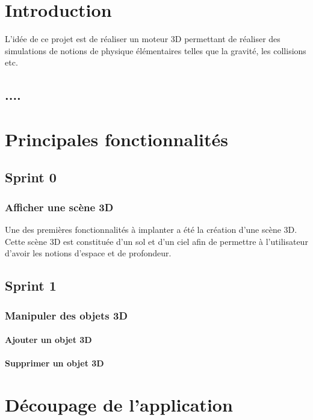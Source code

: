 \documentclass[11pt]{report}
\begin{document}


\tableofcontents


\chapter{Introduction}

L'idée de ce projet est de réaliser un moteur 3D permettant de réaliser des simulations de notions de 
physique élémentaires telles que la gravité, les collisions etc.

\section{....}





\chapter{Principales fonctionnalités}

\section{Sprint 0}

\subsection{Afficher une scène 3D}
Une des premières fonctionnalités à implanter a été la création d'une scène 3D. 
Cette scène 3D est constituée d'un sol et d'un ciel afin de permettre à l'utilisateur d'avoir les notions
d'espace et de profondeur.


\section{Sprint 1}
\subsection{Manipuler des objets 3D}
\subsubsection{Ajouter un objet 3D}
\subsubsection{Supprimer un objet 3D}

\chapter{Découpage de l'application}
\end{document}
